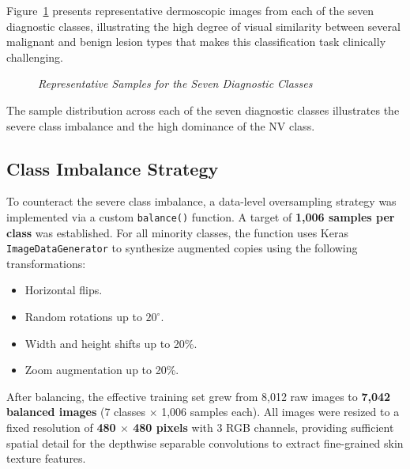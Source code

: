 Figure~\ref{fig:dataset_samples} presents representative dermoscopic images from
each of the seven diagnostic classes, illustrating the high degree of visual
similarity between several malignant and benign lesion types that makes this
classification task clinically challenging.

\begin{figure}[H]
	\centering
	\caption{\textit{Representative Samples for the Seven Diagnostic Classes}}
	\label{fig:dataset_samples}
\end{figure}

The sample distribution across each of the seven diagnostic classes illustrates the severe class imbalance and the high dominance of the NV class.

\subsection{Class Imbalance Strategy}
To counteract the severe class imbalance, a data-level oversampling strategy was
implemented via a custom \texttt{balance()} function. A target of \textbf{1,006
	samples per class} was established. For all minority classes, the function uses
Keras \texttt{ImageDataGenerator} to synthesize augmented copies using the
following transformations:

\begin{itemize}
	\item Horizontal flips.
	\item Random rotations up to $20^{\circ}$.
	\item Width and height shifts up to 20\%.
	\item Zoom augmentation up to 20\%.
\end{itemize}

After balancing, the effective training set grew from 8,012 raw images to
\textbf{7,042 balanced images} (7 classes $\times$ 1,006 samples each). All images
were resized to a fixed resolution of \textbf{480 $\times$ 480 pixels} with 3 RGB
channels, providing sufficient spatial detail for the depthwise separable convolutions
to extract fine-grained skin texture features.

